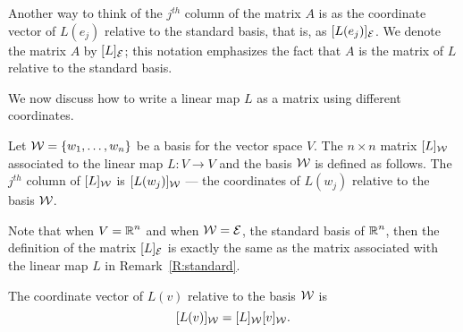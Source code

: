 \documentclass{ximera}
\begin{document}
\begin{rmk} \label{R:standard} {\rm
Another way to think of the $j^{th}$ column of the matrix $A$
is as the coordinate vector of $L(e_j)$ relative to the
standard basis, that is, as $[L(e_j)]_{\cal E}$.  We denote the
matrix $A$ by $[L]_{\cal E}$; this notation emphasizes the fact
that $A$ is the matrix of $L$ relative to the standard basis.}
\end{rmk}


We now discuss how to write a linear map $L$ as a matrix using
different coordinates.
\begin{Def} \label{D:matrixincoord}
Let ${\cal W} = \{w_1,\ldots,w_n\}$ be a basis for the vector
space $V$. The $n\times n$ matrix $[L]_{\cal W}$ associated to
the linear map $L:V\to V$ and the basis ${\cal W}$ is defined
as follows.  The $j^{th}$ column of $[L]_{\cal W}$ is
$[L(w_j)]_{\cal W}$ --- the coordinates of $L(w_j)$ relative
to the basis ${\cal W}$.
\end{Def} 

Note that when $V=\mbox{$\Bbb{R}$}^n$ and when ${\cal W} = {\cal E}$, the
standard basis of $\mbox{$\Bbb{R}$}^n$, then the definition of the matrix
$[L]_{\cal E}$ is exactly the same as the matrix associated
with the linear map $L$ in Remark~\ref{R:standard}.

\begin{lemma}
The coordinate vector of $L(v)$ relative to the basis ${\cal W}$ is
\begin{equation} \label{e:matrixofL}
[L(v)]_{\cal W} = [L]_{\cal W} [v]_{\cal W}.
\end{equation}
\end{lemma}  
\end{document}
